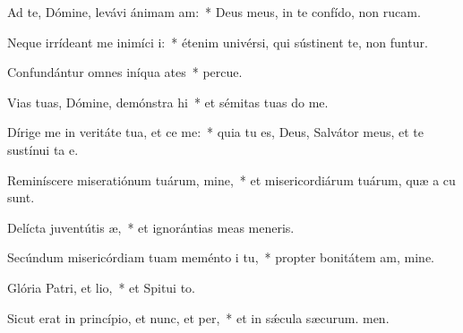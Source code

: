\item Ad te, Dómine, levávi ánimam am:~* Deus meus, in te confído, non rucam.
\item Neque irrídeant me inimíci i:~* étenim univérsi, qui sústinent te, non funtur.
\item Confundántur omnes iníqua ates~* percue.
\item Vias tuas, Dómine, demónstra hi~* et sémitas tuas do me.
\item Dírige me in veritáte tua, et ce me:~* quia tu es, Deus, Salvátor meus, et te sustínui ta e.
\item Reminíscere miseratiónum tuárum, mine,~* et misericordiárum tuárum, quæ a cu sunt.
\item Delícta juventútis æ,~* et ignorántias meas  meneris.
\item Secúndum misericórdiam tuam meménto i tu,~* propter bonitátem am, mine.
\item Glória Patri, et lio,~* et Spitui to.
\item Sicut erat in princípio, et nunc, et per,~* et in sǽcula sæcurum. men.

